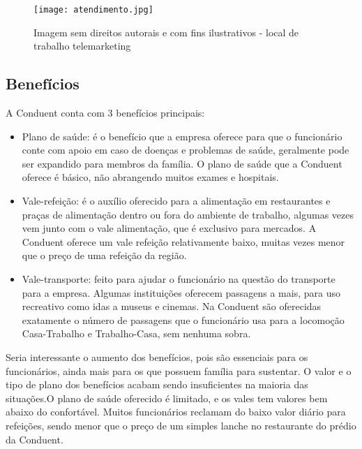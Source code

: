 \documentclass[12pt]{article}
\begin{document}
\begin{figure}[h]
	\centering
	\texttt{[image: atendimento.jpg]}
	\caption{Imagem sem direitos autorais e com fins ilustrativos - local de trabalho telemarketing}
	\label{fig:mesh1}
\end{figure}

\newpage

\subsection{Benefícios}

A Conduent conta com 3 benefícios principais:



\begin{itemize}
\item Plano de saúde:
\subitem é o benefício que a empresa oferece para que o funcionário conte com apoio em caso de doenças e problemas de saúde, geralmente pode ser expandido para membros da família. O plano de saúde que a Conduent oferece é básico, não abrangendo muitos exames e hospitais.

\item Vale-refeição:
\subitem é o auxílio oferecido para a alimentação em restaurantes e praças de alimentação dentro ou fora do ambiente de trabalho, algumas vezes vem junto com o vale alimentação, que é exclusivo para mercados. A Conduent oferece um vale refeição relativamente baixo, muitas vezes menor que o preço de uma refeição da região.

\item Vale-transporte:
\subitem feito para ajudar o funcionário na questão do transporte para a empresa. Algumas instituições oferecem passagens a mais, para uso recreativo como idas a museus e cinemas. Na Conduent são oferecidas exatamente o número de passagens que o funcionário usa para a locomoção Casa-Trabalho e Trabalho-Casa, sem nenhuma sobra.

\end{itemize}

Seria interessante o aumento dos benefícios, pois são essenciais para os funcionários, ainda mais para os que possuem família para sustentar. O valor e o tipo de plano dos benefícios acabam sendo insuficientes na maioria das situações.O plano de saúde oferecido é limitado, e os vales tem valores bem abaixo do confortável. Muitos funcionários reclamam do baixo valor diário para refeições, sendo menor que o preço de um simples lanche no restaurante do prédio da Conduent.
\end{document}
